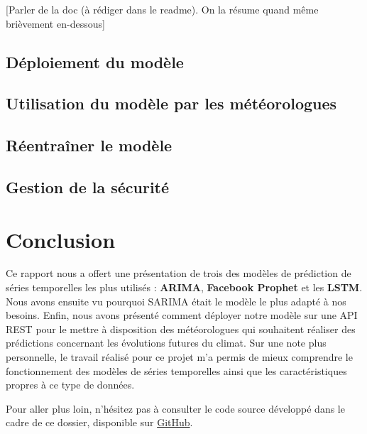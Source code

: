\documentclass[french]{article}
\begin{document}
    [Parler de la doc (à rédiger dans le readme). On la résume quand même brièvement en-dessous]
    \subsection{Déploiement du modèle}
    \subsection{Utilisation du modèle par les météorologues}
    \subsection{Réentraîner le modèle}
    \subsection{Gestion de la sécurité}



    \newpage
    \section*{Conclusion}
    Ce rapport nous a offert une présentation de trois des modèles de prédiction de séries temporelles les plus utilisés : \textbf{ARIMA}, \textbf{Facebook Prophet} et les \textbf{LSTM}. Nous avons ensuite vu pourquoi SARIMA était le modèle le plus adapté à nos besoins. Enfin, nous avons présenté comment déployer notre modèle sur une API REST pour le mettre à disposition des météorologues qui souhaitent réaliser des prédictions concernant les évolutions futures du climat.
    Sur une note plus personnelle, le travail réalisé pour ce projet m'a permis de mieux comprendre le fonctionnement des modèles de séries temporelles ainsi que les caractéristiques propres à ce type de données.

    Pour aller plus loin, n'hésitez pas à consulter le code source développé dans le cadre de ce dossier, disponible sur \href{https://github.com/vinpap/predict_climate_change}{GitHub}.

\end{document}
